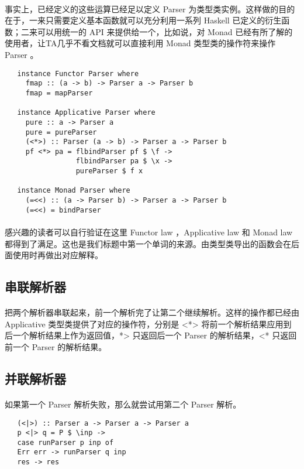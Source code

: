 \documentclass{article}
\begin{document}
   \paragraph{}
    事实上，已经定义的这些运算已经足以定义 Parser 为类型类实例。这样做的目的在于，一来只需要定义基本函数就可以充分利用一系列 Haskell 已定义的衍生函数；二来可以用统一的 API 来提供给一个，比如说，对 Monad 已经有所了解的使用者，让TA几乎不看文档就可以直接利用 Monad 类型类的操作符来操作 Parser 。
   \begin{lstlisting}
   instance Functor Parser where
     fmap :: (a -> b) -> Parser a -> Parser b
     fmap = mapParser
     
   instance Applicative Parser where
     pure :: a -> Parser a
     pure = pureParser  
     (<*>) :: Parser (a -> b) -> Parser a -> Parser b
     pf <*> pa = flbindParser pf $ \f ->
                 flbindParser pa $ \x ->
                 pureParser $ f x
   
   instance Monad Parser where
     (=<<) :: (a -> Parser b) -> Parser a -> Parser b
     (=<<) = bindParser 
   \end{lstlisting}
   \paragraph{}
    感兴趣的读者可以自行验证在这里 Functor law ，Applicative law 和 Monad law 都得到了满足。这也是我们标题中第一个单词的来源。由类型类导出的函数会在后面使用时再做出对应解释。
   \subsection{串联解析器}
   \paragraph{}
   把两个解析器串联起来，前一个解析完了让第二个继续解析。这样的操作都已经由 Applicative 类型类提供了对应的操作符，分别是 <*> 将前一个解析结果应用到后一个解析结果上作为返回值，*> 只返回后一个 Parser 的解析结果，<* 只返回前一个 Parser 的解析结果。
   \subsection{并联解析器} 
   \paragraph{}
   如果第一个 Parser 解析失败，那么就尝试用第二个 Parser 解析。
   \begin{lstlisting}
   (<|>) :: Parser a -> Parser a -> Parser a
   p <|> q = P $ \inp ->
   case runParser p inp of
   Err err -> runParser q inp
   res -> res
   \end{lstlisting}
\end{document}
